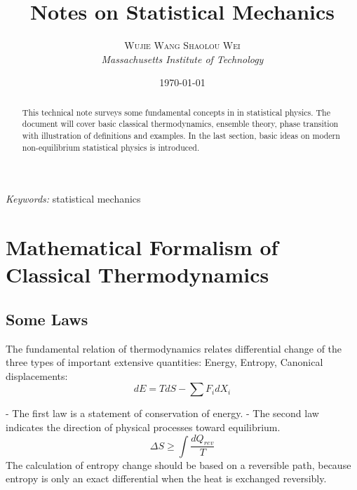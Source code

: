 \documentclass[12pt, oneside]{article}   	%
\title{\textbf{Notes on Statistical Mechanics}\\ %
} %
\author{\textsc{Wujie Wang Shaolou Wei} %
\\{\textit{Massachusetts Institute of Technology}}} %
\date{\today} %
\begin{document}
\maketitle %



\begin{abstract}
This technical note surveys some fundamental concepts in in statistical physics. The document will cover basic classical thermodynamics, ensemble theory, phase transition with illustration of definitions and examples. In the last section, basic ideas on modern non-equilibrium statistical physics is introduced. 
\end{abstract}

\hspace*{3,6mm}\textit{Keywords:} statistical mechanics %

\vspace{10pt} %


\section{Mathematical Formalism of Classical Thermodynamics}

\subsection{Some Laws}
\par
The fundamental relation of thermodynamics relates differential change of the three types of important extensive quantities: Energy, Entropy, Canonical displacements: 
$$dE = TdS - \sum{F_i dX_i}$$

\par 
- The first law is a statement of conservation of energy. 
- The second law indicates the direction of physical processes toward equilibrium. 
$$\Delta S \geq \int \frac{dQ_{rev}}{T} $$
The calculation of entropy change should be based on a reversible path, because entropy is only an exact differential when the heat is exchanged reversibly.
\end{document}
